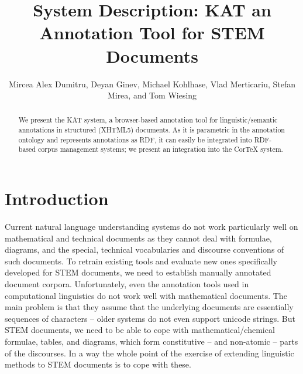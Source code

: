 \documentclass{llncs}
\title{System Description: KAT an Annotation Tool for STEM Documents}
\author{Mircea Alex Dumitru, Deyan Ginev, Michael  Kohlhase, Vlad Merticariu, Stefan
  Mirea, and Tom Wiesing}
\institute{
  Computer Science\\ Jacobs University Bremen\\
  \url{http://kwarc.info}
}
\def\sys{\textsf{KAT}\xspace}
\begin{document}
\maketitle
\begin{abstract}
  We present the \sys system, a browser-based annotation tool for linguistic/semantic
  annotations in structured (XHTML5) documents. As it is parametric in the annotation
  ontology and represents annotations as RDF, it can easily be integrated into RDF-based
  corpus management systems; we present an integration into the CorTeX system.
\end{abstract}

\section{Introduction}\label{sec:intro}

Current natural language understanding systems do not work particularly well on
mathematical and technical documents as they cannot deal with formulae, diagrams, and the
special, technical vocabularies and discourse conventions of such documents. To retrain
existing tools and evaluate new ones specifically developed for STEM documents, we need to
establish manually annotated document corpora. Unfortunately, even the annotation tools
used in computational linguistics do not work well with mathematical documents. The main
problem is that they assume that the underlying documents are essentially sequences of
characters -- older systems do not even support unicode strings. But STEM documents, we
need to be able to cope with mathematical/chemical formulae, tables, and diagrams, which
form constitutive -- and non-atomic -- parts of the discourses. In a way the whole point
of the exercise of extending linguistic methods to STEM documents is to cope with these. 
\end{document}
